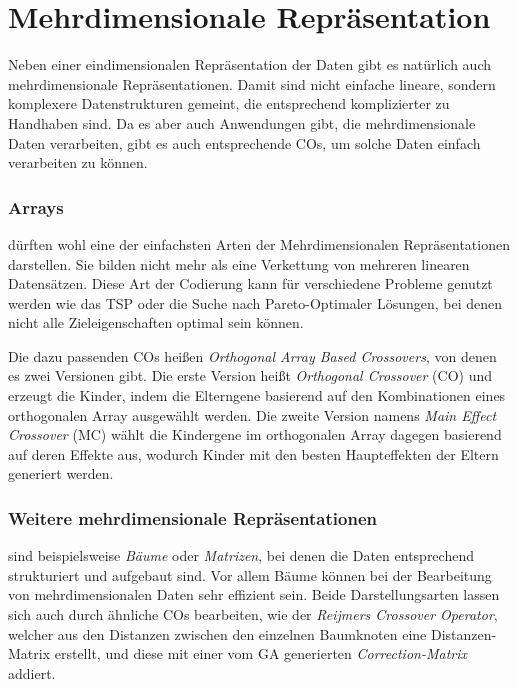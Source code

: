 
\section{Mehrdimensionale Repräsentation}
\label{sec:MehrdimRep}

	Neben einer eindimensionalen Repräsentation der Daten gibt es natürlich auch mehrdimensionale Repräsentationen. Damit sind nicht einfache lineare, sondern komplexere Datenstrukturen gemeint, die entsprechend komplizierter zu Handhaben sind. Da es aber auch Anwendungen gibt, die mehrdimensionale Daten verarbeiten, gibt es auch entsprechende COs, um solche Daten einfach verarbeiten zu können.
	
	\subsubsection{Arrays}
	\label{sec:Arrays}
	
		dürften wohl eine der einfachsten Arten der Mehrdimensionalen Re\-prä\-sen\-ta\-ti\-on\-en darstellen. Sie bilden nicht mehr als eine Verkettung von mehreren linearen Datensätzen. Diese Art der Codierung kann für verschiedene Probleme genutzt werden wie \zB das TSP oder die Suche nach Pareto-Optimaler Lösungen, bei denen nicht alle Zieleigenschaften optimal sein können.
		
		Die dazu passenden COs heißen \uA \textit{Orthogonal Array Based Crossovers}, von denen es zwei Versionen gibt. Die erste Version heißt \textit{Orthogonal Crossover} (CO) und erzeugt die Kinder, indem die Elterngene basierend auf den Kombinationen eines orthogonalen Array ausgewählt werden. Die zweite Version namens \textit{Main Effect Crossover} (MC) wählt die Kindergene im orthogonalen Array dagegen basierend auf deren Effekte aus, wodurch Kinder mit den besten Haupteffekten der Eltern generiert werden. \cite{ArrayCrossover}
	
	\subsubsection{Weitere mehrdimensionale Repräsentationen}
	\label{sec:WeitereMehrdim}
	
		sind beispielsweise \textit{Bäume} oder \textit{Matrizen}, bei denen die Daten entsprechend strukturiert und aufgebaut sind. Vor allem Bäume können bei der Bearbeitung von mehrdimensionalen Daten sehr effizient sein. Beide Darstellungsarten lassen sich \uA auch durch ähnliche COs bearbeiten, wie \zB der \textit{Reijmers Crossover Operator}, welcher aus den Distanzen zwischen den einzelnen Baumknoten eine Distanzen-Matrix erstellt, und diese mit einer vom GA generierten \textit{Correction-Matrix} addiert. \cite{MatrixCO}